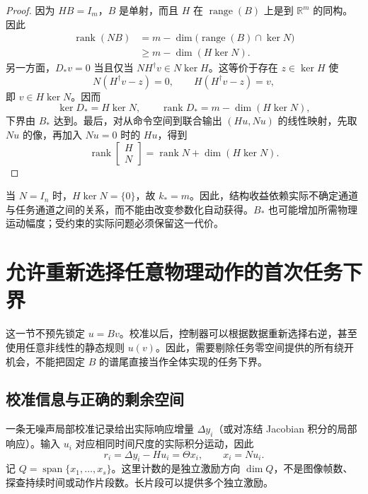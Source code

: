 \documentclass[11pt,a4paper]{article}
\numberwithin{equation}{section}
\theoremstyle{definition}
\begin{document}
\begin{proof}
因为 $HB=I_m$，$B$ 是单射，而且 $H$ 在 $\operatorname{range}(B)$ 上是到 $\mathbb R^m$ 的同构。因此
\begin{align}
  \operatorname{rank}(NB)
  &=m-\dim\big(\operatorname{range}(B)\cap\ker N\big)\\
  &\ge m-\dim(H\ker N).
  \label{eq:cal-rank-lower}
\end{align}
另一方面，$D_*v=0$ 当且仅当 $NH^\dagger v\in N\ker H$。这等价于存在 $z\in\ker H$ 使
\begin{equation}
  N(H^\dagger v-z)=0,\qquad
  H(H^\dagger v-z)=v ,
\end{equation}
即 $v\in H\ker N$。因而
\begin{equation}
  \ker D_*=H\ker N,\qquad
  \operatorname{rank}D_*=m-\dim(H\ker N),
\end{equation}
下界由 $B_*$ 达到。最后，对从命令空间到联合输出 $(Hu,Nu)$ 的线性映射，先取 $Nu$ 的像，再加入 $Nu=0$ 时的 $Hu$，得到
\begin{equation}
  \operatorname{rank}
  \begin{bmatrix}H\\N\end{bmatrix}
  =\operatorname{rank}N+\dim(H\ker N).
\end{equation}
\end{proof}

当 $N=I_n$ 时，$H\ker N=\{0\}$，故 $k_*=m$。因此，结构收益依赖实际不确定通道与任务通道之间的关系，而不能由改变参数化自动获得。$B_*$ 也可能增加所需物理运动幅度；受约束的实际问题必须保留这一代价。

\section{允许重新选择任意物理动作的首次任务下界}
\label{sec:cal-minimax}

这一节不预先锁定 $u=Bv$。校准以后，控制器可以根据数据重新选择右逆，甚至使用任意非线性的静态规则 $u(v)$。因此，需要剔除任务零空间提供的所有绕开机会，不能把固定 $B$ 的谱尾直接当作全体实现的任务下界。

\subsection{校准信息与正确的剩余空间}

一条无噪声局部校准记录给出实际响应增量 $\Delta y_i$（或对冻结 Jacobian 积分的局部响应）。输入 $u_i$ 对应相同时间尺度的实际积分运动，因此
\begin{equation}
  r_i=\Delta y_i-Hu_i=\Theta x_i,\qquad x_i=Nu_i .
  \label{eq:cal-probe-oracle}
\end{equation}
记 $Q=\operatorname{span}\{x_1,\ldots,x_s\}$。这里计数的是独立激励方向 $\dim Q$，不是图像帧数、探查持续时间或动作片段数。长片段可以提供多个独立激励。
\end{document}
